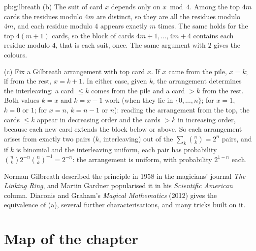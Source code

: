 \begin{solution}{pb:gilbreath}
(b) The suit of card $x$ depends only on $x\bmod4$. Among the top $4m$ cards the residues modulo $4m$ are distinct, so they are all the residues
modulo $4m$, and each residue modulo $4$ appears exactly $m$ times. The same holds for the top $4(m+1)$ cards, so the block of cards $4m+1,\dots,4m+4$
contains each residue modulo $4$, that is each suit, once. The same argument with $2$ gives the colours.

(c) Fix a Gilbreath arrangement with top card $x$. If $x$ came from the pile, $x=k$; if from the rest, $x=k+1$. In either case, given $k$, the
arrangement determines the interleaving: a card $\le k$ comes from the pile and a card $>k$ from the rest. Both values $k=x$ and $k=x-1$ work (when
they lie in $\{0,\dots,n\}$; for $x=1$, $k=0$ or $1$; for $x=n$, $k=n-1$ or $n$): reading the arrangement from the top, the cards $\le k$ appear in decreasing
order and the cards $>k$ in increasing order, because each new card extends the block below or above. So each arrangement arises from
exactly two pairs ($k$, interleaving) out of the $\sum_k\binom nk=2^n$ pairs, and if $k$ is binomial and the interleaving uniform, each pair has probability
$\binom nk2^{-n}\binom nk^{-1}=2^{-n}$: the arrangement is uniform, with probability $2^{1-n}$ each.

\leads Norman Gilbreath described the principle in 1958 in the magicians' journal \emph{The Linking Ring}, and Martin Gardner popularised it
in his \emph{Scientific American} column. Diaconis and Graham's \emph{Magical Mathematics} (2012) gives the equivalence of (a), several further
characterisations, and many tricks built on it.
\end{solution}

\section*{Map of the chapter}

